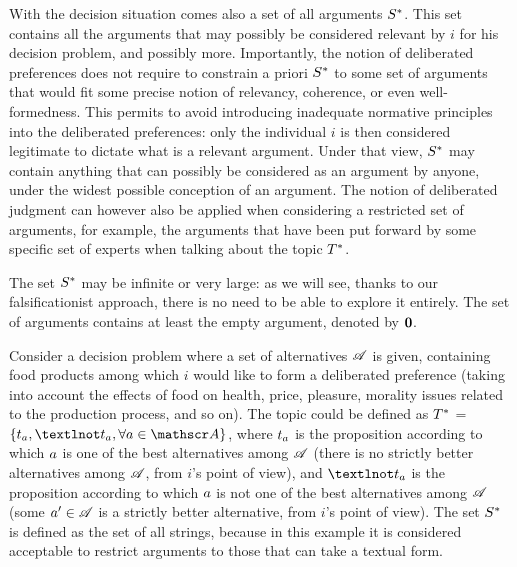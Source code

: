 \documentclass[version=last, pagesize, twoside=off, bibliography=totoc, DIV=calc, fontsize=12pt, a4paper, french, english]{scrartcl}
\begin{document}
With the decision situation comes also a set of all arguments $S^*$. This set contains all the arguments that may possibly be considered relevant by $i$ for his decision problem, and possibly more.
Importantly, the notion of deliberated preferences does not require to constrain a priori $S^*$ to some set of arguments that would fit some precise notion of relevancy, coherence, or even well-formedness. This permits to avoid introducing inadequate normative principles into the deliberated preferences: only the individual $i$ is then considered legitimate to dictate what is a relevant argument. Under that view, $S^*$ may contain anything that can possibly be considered as an argument by anyone, under the widest possible conception of an argument. The notion of deliberated judgment can however also be applied when considering a restricted set of arguments, for example, the arguments that have been put forward by some specific set of experts when talking about the topic $T^*$. 

The set $S^*$ may be infinite or very large: as we will see, thanks to our falsificationist approach, there is no need to be able to explore it entirely. The set of arguments contains at least the empty argument, denoted by $\mathbf{0}$.

\begin{example}
	Consider a decision problem where a set of alternatives $\mathscr{A}$ is given, containing food products among which $i$ would like to form a deliberated preference (taking into account the effects of food on health, price, pleasure, morality issues related to the production process, and so on). The topic could be defined as $T^*$ = $\set{\prop_\alt, ¬\prop_\alt, \forall \alt \in \allalts}$, where $t_a$ is the proposition according to which $a$ is one of the best alternatives among $\mathscr{A}$ (there is no strictly better alternatives among $\mathscr{A}$, from $i$’s point of view), and $¬\prop_\alt$ is the proposition according to which $a$ is not one of the best alternatives among $\mathscr{A}$ (some $a' \in \mathscr{A}$ is a strictly better alternative, from $i$’s point of view). 
	The set $S^*$ is defined as the set of all strings, because in this example it is considered acceptable to restrict arguments to those that can take a textual form.
\end{example}
\end{document}
